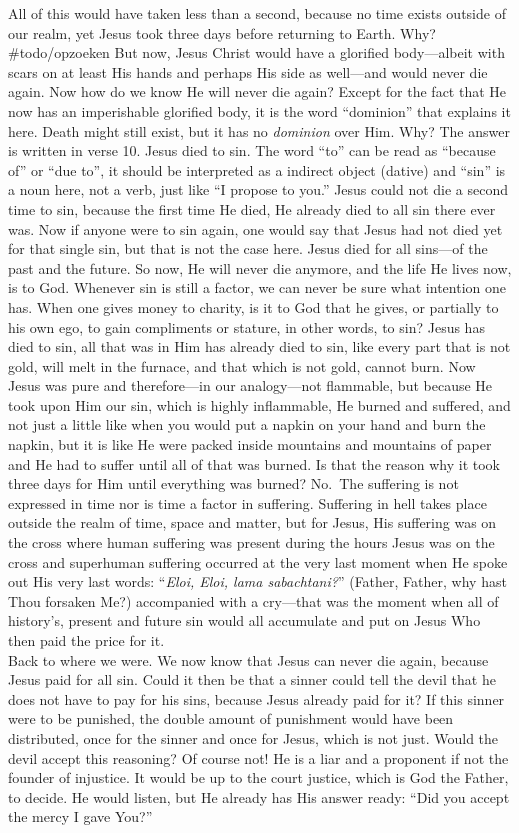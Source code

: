 All of this would have taken less than a second, because no time exists
outside of our realm, yet Jesus took three days before returning to
Earth. Why? \#todo/opzoeken But now, Jesus Christ would have a glorified
body---albeit with scars on at least His hands and perhaps His side as
well---and would never die again. Now how do we know He will never die
again? Except for the fact that He now has an imperishable glorified
body, it is the word ``dominion'' that explains it here. Death might
still exist, but it has no \emph{dominion} over Him. Why? The answer is
written in verse 10. Jesus died to sin. The word ``to'' can be read as
``because of'' or ``due to'', it should be interpreted as a indirect
object (dative) and ``sin'' is a noun here, not a verb, just like ``I
propose to you.'' Jesus could not die a second time to sin, because the
first time He died, He already died to all sin there ever was. Now if
anyone were to sin again, one would say that Jesus had not died yet for
that single sin, but that is not the case here. Jesus died for all
sins---of the past and the future. So now, He will never die anymore,
and the life He lives now, is to God. Whenever sin is still a factor, we
can never be sure what intention one has. When one gives money to
charity, is it to God that he gives, or partially to his own ego, to
gain compliments or stature, in other words, to sin? Jesus has died to
sin, all that was in Him has already died to sin, like every part that
is not gold, will melt in the furnace, and that which is not gold,
cannot burn. Now Jesus was pure and therefore---in our analogy---not
flammable, but because He took upon Him our sin, which is highly
inflammable, He burned and suffered, and not just a little like when you
would put a napkin on your hand and burn the napkin, but it is like He
were packed inside mountains and mountains of paper and He had to suffer
until all of that was burned. Is that the reason why it took three days
for Him until everything was burned? No.~The suffering is not expressed
in time nor is time a factor in suffering. Suffering in hell takes place
outside the realm of time, space and matter, but for Jesus, His
suffering was on the cross where human suffering was present during the
hours Jesus was on the cross and superhuman suffering occurred at the
very last moment when He spoke out His very last words: ``\emph{Eloi,
Eloi, lama sabachtani?}'' (Father, Father, why hast Thou forsaken Me?)
accompanied with a cry---that was the moment when all of history's,
present and future sin would all accumulate and put on Jesus Who then
paid the price for it.\\
Back to where we were. We now know that Jesus can never die again,
because Jesus paid for all sin. Could it then be that a sinner could
tell the devil that he does not have to pay for his sins, because Jesus
already paid for it? If this sinner were to be punished, the double
amount of punishment would have been distributed, once for the sinner
and once for Jesus, which is not just. Would the devil accept this
reasoning? Of course not! He is a liar and a proponent if not the
founder of injustice. It would be up to the court justice, which is God
the Father, to decide. He would listen, but He already has His answer
ready: ``Did you accept the mercy I gave You?''

